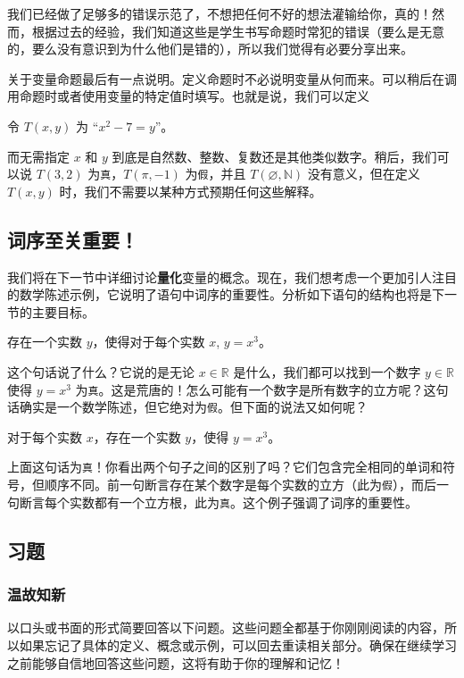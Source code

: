 我们已经做了足够多的错误示范了，不想把任何不好的想法灌输给你，真的！然而，根据过去的经验，我们知道这些是学生书写命题时常犯的错误（要么是无意的，要么没有意识到为什么他们是错的），所以我们觉得有必要分享出来。

关于变量命题最后有一点说明。定义命题时不必说明变量从何而来。可以稍后在调用命题时或者使用变量的特定值时填写。也就是说，我们可以定义
\begin{center}
    令 $T(x, y)$ 为 ``$x^2 - 7 = y$''。
\end{center}
而无需指定 $x$ 和 $y$ 到底是自然数、整数、复数还是其他类似数字。稍后，我们可以说 $T(3, 2)$ 为\verb|真|，$T(\pi, -1)$ 为\verb|假|，并且 $T(\varnothing, \mathbb{N})$ 没有意义，但在定义 $T(x, y)$ 时，我们不需要以某种方式预期任何这些解释。

\subsection{词序至关重要！}\label{sec:section4.2.4}

我们将在下一节中详细讨论\textbf{量化}变量的概念。现在，我们想考虑一个更加引人注目的数学陈述示例，它说明了语句中词序的重要性。分析如下语句的结构也将是下一节的主要目标。
\begin{center}
    存在一个实数 $y$，使得对于每个实数 $x$, $y = x^3$。
\end{center}
这个句话说了什么？它说的是无论 $x \in \mathbb{R}$ 是什么，我们都可以找到一个数字 $y \in \mathbb{R}$ 使得 $y = x^3$ 为\verb|真|。这是荒唐的！怎么可能有一个数字是所有数字的立方呢？这句话确实是一个数学陈述，但它绝对为\verb|假|。但下面的说法又如何呢？
\begin{center}
    对于每个实数 $x$，存在一个实数 $y$，使得 $y = x^3$。
\end{center}
上面这句话为\verb|真|！你看出两个句子之间的区别了吗？它们包含完全相同的单词和符号，但顺序不同。前一句断言存在某个数字是每个实数的立方（此为\verb|假|），而后一句断言每个实数都有一个立方根，此为\verb|真|。这个例子强调了词序的重要性。

\subsection{习题}

\subsubsection*{温故知新}

以口头或书面的形式简要回答以下问题。这些问题全都基于你刚刚阅读的内容，所以如果忘记了具体的定义、概念或示例，可以回去重读相关部分。确保在继续学习之前能够自信地回答这些问题，这将有助于你的理解和记忆！

